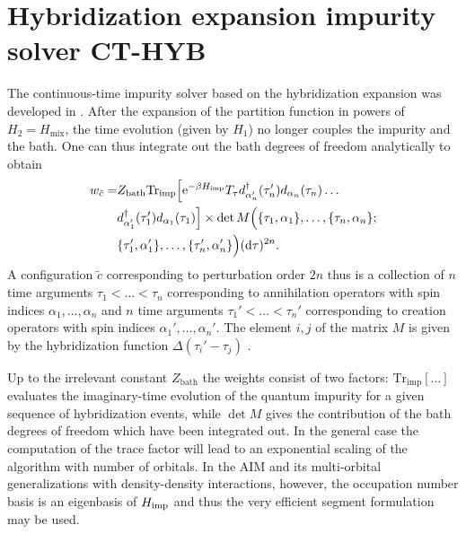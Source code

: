 \documentclass[3p,twocolumn]{elsarticle}
\begin{document}
\section{Hybridization expansion impurity solver CT-HYB}
\label{cthyb_sec}

The continuous-time impurity solver based on the hybridization expansion was developed in \cite{Werner06,Werner06Kondo}. After the expansion of the partition function in powers of $H_2=H_\text{mix}$, the time evolution (given by $H_1$) no longer couples the impurity and the bath. One can thus integrate out the bath degrees of freedom analytically to obtain
%
\begin{align}
w_{\tilde c}=&Z_\text{bath} \nonumber
\text{Tr}_\text{imp} \Big[{\rm e}^{-\beta H_\text{imp}} T_\tau
d^\dagger_{\alpha_n'}(\tau_{n}')d_{\alpha_{n}}(\tau_n)
\ldots \\
&d^\dagger_{\alpha_1'}(\tau_1')d_{\alpha_1}(\tau_1) \Big]\nonumber
\times \det M\Big(\{\tau_1, \alpha_1\},\ldots,\{\tau_{n},\alpha_n\}; \\ 
&\{\tau_1',\alpha_1'\},\ldots,\{\tau_{n}',\alpha_n'\}\Big) ({\rm d}\tau)^{2n}.
\label{weight_strong}
\end{align}
%
A configuration $\tilde c$ corresponding to perturbation order $2n$ thus is a collection of $n$ time arguments $\tau_1<\ldots<\tau_n$ corresponding to annihilation operators with spin indices $\alpha_1, \ldots,\alpha_n$ and $n$ time arguments $\tau_1'<\ldots<\tau_n'$ corresponding to creation operators with spin indices $\alpha_1', \ldots, \alpha_n'$. The element $i,j$ of the matrix $M$ is given by the hybridization function $\Delta(\tau_i'-\tau_j)$ \cite{Werner06Kondo}. 

Up to the irrelevant constant $Z_\text{bath}$ the weights consist of two factors: $\text{Tr}_\text{imp}[\ldots]$ evaluates the imaginary-time evolution of the quantum impurity for a given sequence of hybridization events, while $\det M$ gives the contribution of the bath degrees of freedom which have been integrated out. In the general case the computation of the trace factor will lead to an exponential scaling of the algorithm with number of orbitals. In the AIM and its multi-orbital generalizations with density-density interactions, however, the occupation number basis is an eigenbasis of $H_{\rm imp}$ and thus the very efficient segment formulation \cite{Werner06} may be used. 
\end{document}
